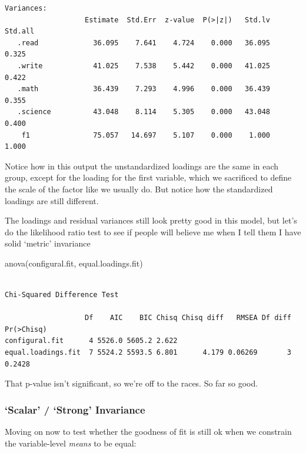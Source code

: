 \documentclass[
  letterpaper,
  DIV=11,
  numbers=noendperiod]{scrreprt}
\newenvironment{Shaded}{\begin{snugshade}}{\end{snugshade}}
\newcommand{\FunctionTok}[1]{\textcolor[rgb]{0.28,0.35,0.67}{#1}}
\newcommand{\NormalTok}[1]{\textcolor[rgb]{0.00,0.23,0.31}{#1}}
\begin{document}
\begin{verbatim}
Variances:
                   Estimate  Std.Err  z-value  P(>|z|)   Std.lv  Std.all
   .read             36.095    7.641    4.724    0.000   36.095    0.325
   .write            41.025    7.538    5.442    0.000   41.025    0.422
   .math             36.439    7.293    4.996    0.000   36.439    0.355
   .science          43.048    8.114    5.305    0.000   43.048    0.400
    f1               75.057   14.697    5.107    0.000    1.000    1.000
\end{verbatim}

Notice how in this output the unstandardized loadings are the same in
each group, except for the loading for the first variable, which we
sacrificed to define the scale of the factor like we usually do. But
notice how the standardized loadings are still different.

The loadings and residual variances still look pretty good in this
model, but let's do the likelihood ratio test to see if people will
believe me when I tell them I have solid `metric' invariance

\begin{Shaded}
\begin{Highlighting}[]
\FunctionTok{anova}\NormalTok{(configural.fit, equal.loadings.fit)}
\end{Highlighting}
\end{Shaded}

\begin{verbatim}

Chi-Squared Difference Test

                   Df    AIC    BIC Chisq Chisq diff   RMSEA Df diff Pr(>Chisq)
configural.fit      4 5526.0 5605.2 2.622                                      
equal.loadings.fit  7 5524.2 5593.5 6.801      4.179 0.06269       3     0.2428
\end{verbatim}

That p-value isn't significant, so we're off to the races. So far so
good.

\hypertarget{scalar-strong-invariance}{%
\subsubsection{`Scalar' / `Strong'
Invariance}\label{scalar-strong-invariance}}

Moving on now to test whether the goodness of fit is still ok when we
constrain the variable-level \emph{means} to be equal:
\end{document}
